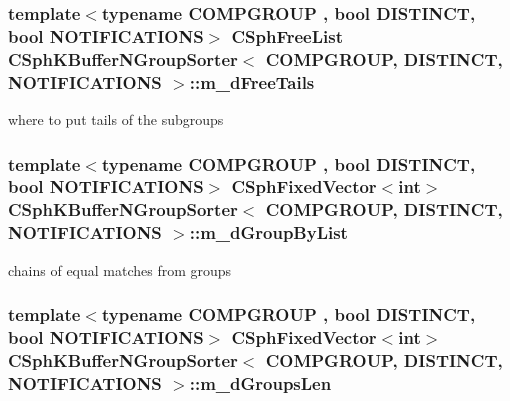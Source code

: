 \hypertarget{classCSphKBufferNGroupSorter_a3aff535ae49e2be8fd977976bcfe8cfc}{
\subsubsection[{m\-\_\-d\-Free\-Tails}]{\setlength{\rightskip}{0pt plus 5cm}template$<$typename C\-O\-M\-P\-G\-R\-O\-U\-P , bool D\-I\-S\-T\-I\-N\-C\-T, bool N\-O\-T\-I\-F\-I\-C\-A\-T\-I\-O\-N\-S$>$ {\bf C\-Sph\-Free\-List} {\bf C\-Sph\-K\-Buffer\-N\-Group\-Sorter}$<$ C\-O\-M\-P\-G\-R\-O\-U\-P, D\-I\-S\-T\-I\-N\-C\-T, N\-O\-T\-I\-F\-I\-C\-A\-T\-I\-O\-N\-S $>$\-::m\-\_\-d\-Free\-Tails\hspace{0.3cm}{\ttfamily [protected]}}}\label{classCSphKBufferNGroupSorter_a3aff535ae49e2be8fd977976bcfe8cfc}


where to put tails of the subgroups 

\hypertarget{classCSphKBufferNGroupSorter_a496bee0a01f257de6bbb52e42fe6ffb8}{
\subsubsection[{m\-\_\-d\-Group\-By\-List}]{\setlength{\rightskip}{0pt plus 5cm}template$<$typename C\-O\-M\-P\-G\-R\-O\-U\-P , bool D\-I\-S\-T\-I\-N\-C\-T, bool N\-O\-T\-I\-F\-I\-C\-A\-T\-I\-O\-N\-S$>$ {\bf C\-Sph\-Fixed\-Vector}$<${\bf int}$>$ {\bf C\-Sph\-K\-Buffer\-N\-Group\-Sorter}$<$ C\-O\-M\-P\-G\-R\-O\-U\-P, D\-I\-S\-T\-I\-N\-C\-T, N\-O\-T\-I\-F\-I\-C\-A\-T\-I\-O\-N\-S $>$\-::m\-\_\-d\-Group\-By\-List\hspace{0.3cm}{\ttfamily [protected]}}}\label{classCSphKBufferNGroupSorter_a496bee0a01f257de6bbb52e42fe6ffb8}


chains of equal matches from groups 

\hypertarget{classCSphKBufferNGroupSorter_ae844b0ff25bad3b3e0bd7cce5b6032d4}{
\subsubsection[{m\-\_\-d\-Groups\-Len}]{\setlength{\rightskip}{0pt plus 5cm}template$<$typename C\-O\-M\-P\-G\-R\-O\-U\-P , bool D\-I\-S\-T\-I\-N\-C\-T, bool N\-O\-T\-I\-F\-I\-C\-A\-T\-I\-O\-N\-S$>$ {\bf C\-Sph\-Fixed\-Vector}$<${\bf int}$>$ {\bf C\-Sph\-K\-Buffer\-N\-Group\-Sorter}$<$ C\-O\-M\-P\-G\-R\-O\-U\-P, D\-I\-S\-T\-I\-N\-C\-T, N\-O\-T\-I\-F\-I\-C\-A\-T\-I\-O\-N\-S $>$\-::m\-\_\-d\-Groups\-Len\hspace{0.3cm}{\ttfamily [protected]}}}\label{classCSphKBufferNGroupSorter_ae844b0ff25bad3b3e0bd7cce5b6032d4}


